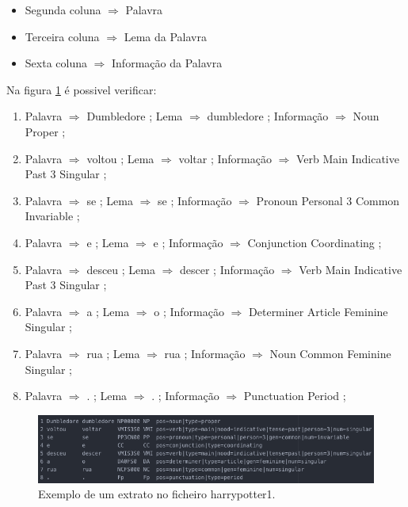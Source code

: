 \documentclass[11pt,a4paper]{report}
\begin{document}
\begin{itemize}
 \item Segunda coluna $\Rightarrow$ Palavra
 \item Terceira coluna $\Rightarrow$ Lema da Palavra
 \item Sexta coluna $\Rightarrow$ Informação da Palavra
\end{itemize}

\vspace{0.5cm}

Na figura \ref{img:analise4} é possivel verificar:

\begin{enumerate}
	\item Palavra $\Rightarrow$ Dumbledore ; Lema $\Rightarrow$ dumbledore ; Informação $\Rightarrow$ Noun Proper ;
	\item Palavra $\Rightarrow$ voltou ; Lema $\Rightarrow$ voltar ; Informação $\Rightarrow$ Verb Main Indicative Past 3 Singular ;
	\item Palavra $\Rightarrow$ se ; Lema $\Rightarrow$ se ; Informação $\Rightarrow$ Pronoun Personal 3 Common Invariable ;
	\item Palavra $\Rightarrow$ e ; Lema $\Rightarrow$ e ; Informação $\Rightarrow$ Conjunction Coordinating ;
	\item Palavra $\Rightarrow$ desceu ; Lema $\Rightarrow$ descer ; Informação $\Rightarrow$ Verb Main Indicative Past 3 Singular ;
	\item Palavra $\Rightarrow$ a ; Lema $\Rightarrow$ o ; Informação $\Rightarrow$ Determiner Article Feminine Singular ;
	\item Palavra $\Rightarrow$ rua ; Lema $\Rightarrow$ rua ; Informação $\Rightarrow$ Noun Common Feminine Singular ;
	\item Palavra $\Rightarrow$ . ; Lema $\Rightarrow$ . ; Informação $\Rightarrow$ Punctuation Period ;
\end{enumerate}


\begin{figure}[H]
\centering
\includegraphics[scale=0.6]{analise4.png}
\caption{Exemplo de um extrato no ficheiro harrypotter1.}
\label{img:analise4}
\end{figure}
\end{document}
